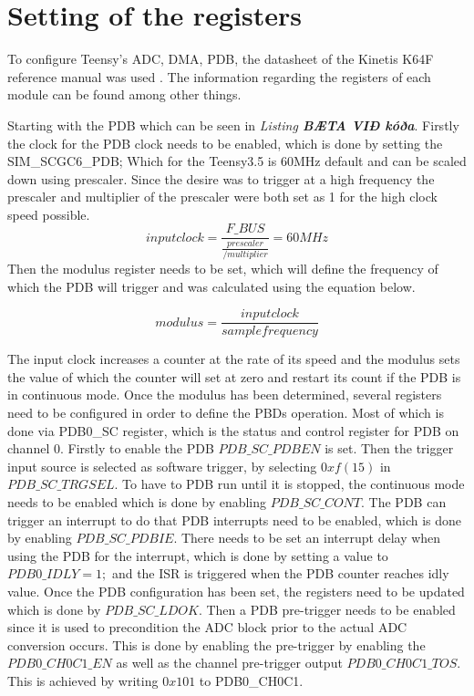 \chapter{Setting of the registers}\label{sec:codeExplain}
To configure Teensy's ADC, DMA, PDB, the datasheet of the Kinetis K64F reference manual was used \cite{freescale_semiconductor_kinetis_2021}.
The information regarding the registers of each module can be found among other things.

Starting with the PDB  which can be seen in \textit{Listing \textbf{BÆTA VIÐ kóða}}.
Firstly the clock for the PDB clock needs to be enabled, which is done by setting the SIM\_SCGC6\_PDB;
Which for the Teensy3.5 is 60MHz default and can be scaled down using prescaler.
Since the desire was to trigger at a high frequency the prescaler and multiplier of the prescaler were both set as 1 for the high clock speed possible.
\textbf{$$input clock = \frac{F\_BUS}{\frac{prescaler}{/multiplier}} = 60MHz$$}
Then the modulus register needs to be set, which will define the frequency of which the PDB will trigger and was calculated using the equation below.

$$modulus = \frac{input clock}{sample frequency}$$

The input clock increases a counter at the rate of its speed and the modulus sets the value of which the counter will set at zero and restart its count if the PDB is in continuous mode.
Once the modulus has been determined, several registers need to be configured in order to define the PBDs operation.
Most of which is done via PDB0\_SC register, which is the status and control register for PDB on channel 0.
Firstly to enable the PDB $ PDB\_SC\_PDBEN $ is set.
Then the trigger input source is selected as software trigger, by selecting $0xf (15)$ in $ PDB\_SC\_TRGSEL $.
To have to PDB run until it is stopped, the continuous mode needs to be enabled which is done by enabling $ PDB\_SC\_CONT $.
The PDB can trigger an interrupt to do that PDB interrupts need to be enabled, which is done by enabling
$ PDB\_SC\_PDBIE $.
There needs to be set an interrupt delay when using the PDB for the interrupt, which is done by setting a value to $PDB0\_IDLY = 1;$ and the ISR is triggered when the PDB counter reaches idly value.
Once the PDB configuration has been set, the registers need to be updated which is done by $ PDB\_SC\_LDOK$.
Then a PDB pre-trigger needs to be enabled since it is used to precondition the ADC block prior to the actual ADC conversion occurs.
This is done by enabling the pre-trigger by enabling the $PDB0\_CH0C1\_EN$ as well as the channel pre-trigger output $PDB0\_CH0C1\_TOS$.
This is achieved by writing $0x101$ to PDB0\_CH0C1.

